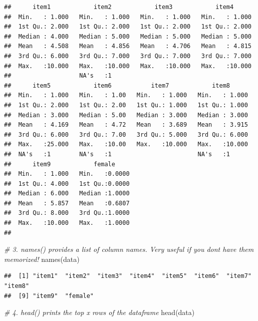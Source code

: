 \documentclass[
]{article}
\newenvironment{Shaded}{\begin{snugshade}}{\end{snugshade}}
\newcommand{\CommentTok}[1]{\textcolor[rgb]{0.56,0.35,0.01}{\textit{#1}}}
\newcommand{\FunctionTok}[1]{\textcolor[rgb]{0.00,0.00,0.00}{#1}}
\newcommand{\NormalTok}[1]{#1}
\begin{document}
\begin{verbatim}
##      item1            item2            item3            item4       
##  Min.   : 1.000   Min.   : 1.000   Min.   : 1.000   Min.   : 1.000  
##  1st Qu.: 2.000   1st Qu.: 2.000   1st Qu.: 2.000   1st Qu.: 2.000  
##  Median : 4.000   Median : 5.000   Median : 5.000   Median : 5.000  
##  Mean   : 4.508   Mean   : 4.856   Mean   : 4.706   Mean   : 4.815  
##  3rd Qu.: 6.000   3rd Qu.: 7.000   3rd Qu.: 7.000   3rd Qu.: 7.000  
##  Max.   :10.000   Max.   :10.000   Max.   :10.000   Max.   :10.000  
##                   NA's   :1                                         
##      item5            item6           item7            item8       
##  Min.   : 1.000   Min.   : 1.00   Min.   : 1.000   Min.   : 1.000  
##  1st Qu.: 2.000   1st Qu.: 2.00   1st Qu.: 1.000   1st Qu.: 1.000  
##  Median : 3.000   Median : 5.00   Median : 3.000   Median : 3.000  
##  Mean   : 4.169   Mean   : 4.72   Mean   : 3.689   Mean   : 3.915  
##  3rd Qu.: 6.000   3rd Qu.: 7.00   3rd Qu.: 5.000   3rd Qu.: 6.000  
##  Max.   :25.000   Max.   :10.00   Max.   :10.000   Max.   :10.000  
##  NA's   :1        NA's   :1                        NA's   :1       
##      item9            female      
##  Min.   : 1.000   Min.   :0.0000  
##  1st Qu.: 4.000   1st Qu.:0.0000  
##  Median : 6.000   Median :1.0000  
##  Mean   : 5.857   Mean   :0.6807  
##  3rd Qu.: 8.000   3rd Qu.:1.0000  
##  Max.   :10.000   Max.   :1.0000  
## 
\end{verbatim}

\begin{Shaded}
\begin{Highlighting}[]
\CommentTok{\# 3. names() provides a list of column names. Very useful if you don\textquotesingle{}t have them memorized!}
\FunctionTok{names}\NormalTok{(data)}
\end{Highlighting}
\end{Shaded}

\begin{verbatim}
##  [1] "item1"  "item2"  "item3"  "item4"  "item5"  "item6"  "item7"  "item8" 
##  [9] "item9"  "female"
\end{verbatim}

\begin{Shaded}
\begin{Highlighting}[]
\CommentTok{\# 4. head() prints the top x rows of the dataframe}
\FunctionTok{head}\NormalTok{(data)}
\end{Highlighting}
\end{Shaded}
\end{document}
